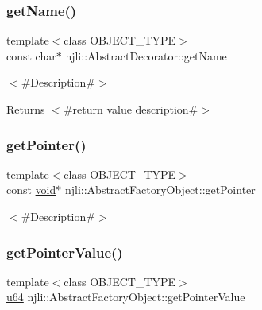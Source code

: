 \mbox{\label{classnjli_1_1_abstract_state_ad41266885be835f3ee602311e20877a4}} 
\subsubsection{\texorpdfstring{get\+Name()}{getName()}}
{\footnotesize\ttfamily template$<$class O\+B\+J\+E\+C\+T\+\_\+\+T\+Y\+PE$>$ \\
const char$\ast$ njli\+::\+Abstract\+Decorator\+::get\+Name}

$<$\#\+Description\#$>$

\begin{DoxyReturn}{Returns}
$<$\#return value description\#$>$ 
\end{DoxyReturn}
\mbox{\label{classnjli_1_1_abstract_state_ac4ca71716ed832be357f15f8262c8448}} 
\subsubsection{\texorpdfstring{get\+Pointer()}{getPointer()}}
{\footnotesize\ttfamily template$<$class O\+B\+J\+E\+C\+T\+\_\+\+T\+Y\+PE$>$ \\
const \mbox{\hyperlink{_thread_8h_af1e856da2e658414cb2456cb6f7ebc66}{void}}$\ast$ njli\+::\+Abstract\+Factory\+Object\+::get\+Pointer}

$<$\#\+Description\#$>$ \mbox{\label{classnjli_1_1_abstract_state_a4ffddf141a426a5a07d0ac19f1913811}} 
\subsubsection{\texorpdfstring{get\+Pointer\+Value()}{getPointerValue()}}
{\footnotesize\ttfamily template$<$class O\+B\+J\+E\+C\+T\+\_\+\+T\+Y\+PE$>$ \\
\mbox{\hyperlink{_util_8h_ad758b7a5c3f18ed79d2fcd23d9f16357}{u64}} njli\+::\+Abstract\+Factory\+Object\+::get\+Pointer\+Value}

